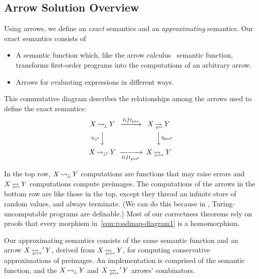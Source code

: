 \documentclass{llncs}
\newcommand{\arrow}{\rightsquigarrow}
\newcommand{\arrowlift}{\ensuremath{lift}}
\DeclareMathOperator{\botto}{\arrow_{\mspace{-3mu}\bot}}
\newcommand{\pre}{_\mathrm{pre}}
\DeclareMathOperator{\preto}{\arrow_{\mspace{-19mu}\pre}}
\newcommand{\liftpre}{\arrowlift\pre}
\newcommand{\pbot}{{\bot^{\mspace{-4mu}*}}}
\DeclareMathOperator{\pbotto}{\arrow_{\mspace{-3mu}\pbot}}
\newcommand{\ppre}{_\mathrm{pre^{\mspace{-2mu}*}}}
\DeclareMathOperator{\ppreto}{\arrow_{\mspace{-19mu}_{\mathrm{pre*}}}}
\newcommand{\liftppre}{\arrowlift\ppre}
\begin{document}
\subsection{Arrow Solution Overview}

\newcommand{\youarehere}[1]%
{%
\begin{equation}%
\begin{CD}%
X \botto Y   @>\liftpre>>   X \preto Y \\%
@V{\eta_\pbot}VV              @VV{\eta\ppre}V\\%
X \pbotto Y  @>>\liftppre>  X \ppreto Y%
\end{CD}%
\label{#1}%
\end{equation}%
}

Using arrows, we define an \emph{exact} semantics and an \emph{approximating} semantics.
Our exact semantics consists of
\begin{itemize}
	\item A semantic function which, like the arrow calculus~\cite{cit:lindley-2010jfp-arrow-calculus} semantic function, transforms first-order programs into the computations of an arbitrary arrow.
	\item Arrows for evaluating expressions in different ways.
\end{itemize}
This commutative diagram describes the relationships among the arrows used to define the exact semantics:
\youarehere{eqn:roadmap-diagram1}
In the top row, $X \botto Y$ computations are functions that may raise errors and $X \preto Y$ computations compute preimages.
The computations of the arrows in the bottom row are like those in the top, except they thread an infinite store of random values, and always terminate.
(We can do this because in \lzfclang, Turing-uncomputable programs are definable.)
Most of our correctness theorems rely on proofs that every morphism in~\eqref{eqn:roadmap-diagram1} is a homomorphism.

Our approximating semantics consists of the same semantic function and an arrow $X \ppreto' Y$, derived from $X \ppreto Y$, for computing conservative approximations of preimages.
An implementation is comprised of the semantic function, and the $X \botto Y$ and $X \ppreto' Y$ arrows' combinators.

\end{document}
